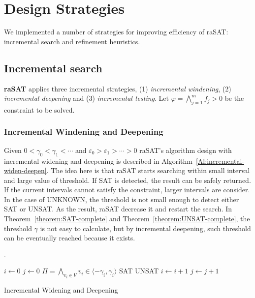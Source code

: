 \chapter{Design Strategies}
We implemented a number of strategies for improving efficiency of raSAT: incremental search and refinement heuristics.
\section{Incremental search} \label{sec:incsearch}
{\bf raSAT} applies three incremental strategies, 
(1) {\em incremental windening}, (2) {\em incremental deepening} and (3) {\em incremental testing}. 
Let
$\varphi = \bigwedge \limits_{j=1}^m f_j > 0$ be the constraint to be solved.

\subsection{Incremental Windening and Deepening}
Given $0 < \gamma_0 < \gamma_1 < \cdots$ and $\varepsilon_0 > \varepsilon_1 > \cdots > 0$ raSAT's algorithm design with incremental widening and deepening is described in Algorithm~\ref{Al:incremental-widen-deepen}. The idea here is that raSAT starts searching within small interval and large value of threshold. If SAT is detected, the result can be safely returned. If the current intervals cannot satisfy the constraint, larger intervals are consider. In the case of UNKNOWN, the threshold is not small enough to detect either SAT or UNSAT. As the result, raSAT decrease it and restart the search. In Theorem~\ref{theorem:SAT-complete} and Theorem~\ref{theorem:UNSAT-complete}, the threshold $\gamma$ is not easy to calculate, but by incremental deepening, such threshold can be eventually reached because it exists.
\begin{algorithm} \label{Al:incremental-widen-deepen}.
\begin{algorithmic}
\State $i\gets 0$
\State $j\gets 0$
	\State $\Pi = \bigwedge\limits_{v_i \in V} v_i \in \langle -\gamma_i, \gamma_i \rangle$ 
		\State \Return SAT
			\State \Return UNSAT
		\Else 
			\State $i \gets i + 1$
		\EndIf
	\Else 
		\State $j \gets j + 1$
	\EndIf
\EndWhile
\end{algorithmic}
\caption{Incremental Widening and Deepening}
\end{algorithm}
